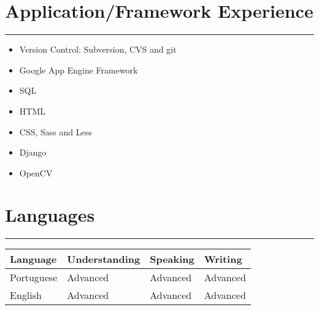 \documentclass[a4paper,english]{article}
\newcommand{\topic}[1]{
\section*{#1} \vspace{-6mm}
\rule{\columnwidth}{.25mm}
}
\begin{document}
\topic{Application/Framework Experience}
\begin{itemize}
\setlength{\itemsep}{-1mm}
    \item Version Control: Subversion, CVS and git
    \item Google App Engine Framework
    \item SQL
    \item HTML
    \item CSS, Sass and Less
    \item Django
    \item OpenCV
\end{itemize}

\topic{Languages}

\begin{tabular}{llll}
Language & Understanding & Speaking & Writing \\
\hline
Portuguese & Advanced & Advanced & Advanced \\
English & Advanced & Advanced & Advanced \\
\end{tabular}
\end{document}
